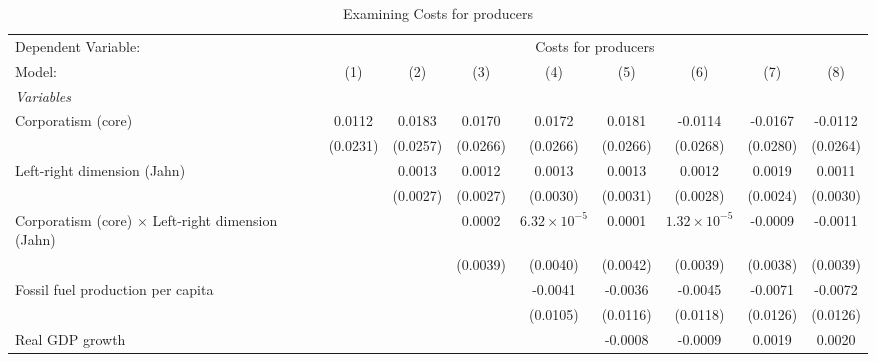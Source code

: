 
\begin{table}[htbp]
   \caption{Examining Costs for producers}
   \centering
   \begin{tabular}{lcccccccc}
      \tabularnewline \midrule \midrule
      Dependent Variable: & \multicolumn{8}{c}{Costs for producers}\\
      Model:                                                   & (1)      & (2)      & (3)      & (4)                   & (5)      & (6)                   & (7)      & (8)\\  
      \midrule
      \emph{Variables}\\
      Corporatism (core)                                       & 0.0112   & 0.0183   & 0.0170   & 0.0172                & 0.0181   & -0.0114               & -0.0167  & -0.0112\\   
                                                               & (0.0231) & (0.0257) & (0.0266) & (0.0266)              & (0.0266) & (0.0268)              & (0.0280) & (0.0264)\\   
      Left-right dimension (Jahn)                              &          & 0.0013   & 0.0012   & 0.0013                & 0.0013   & 0.0012                & 0.0019   & 0.0011\\   
                                                               &          & (0.0027) & (0.0027) & (0.0030)              & (0.0031) & (0.0028)              & (0.0024) & (0.0030)\\   
      Corporatism (core) $\times$ Left-right dimension (Jahn)  &          &          & 0.0002   & $6.32\times 10^{-5}$  & 0.0001   & $1.32\times 10^{-5}$  & -0.0009  & -0.0011\\   
                                                               &          &          & (0.0039) & (0.0040)              & (0.0042) & (0.0039)              & (0.0038) & (0.0039)\\   
      Fossil fuel production per capita                        &          &          &          & -0.0041               & -0.0036  & -0.0045               & -0.0071  & -0.0072\\   
                                                               &          &          &          & (0.0105)              & (0.0116) & (0.0118)              & (0.0126) & (0.0126)\\   
      Real GDP growth                                          &          &          &          &                       & -0.0008  & -0.0009               & 0.0019   & 0.0020\\   

\end{tabular}
\end{table}
